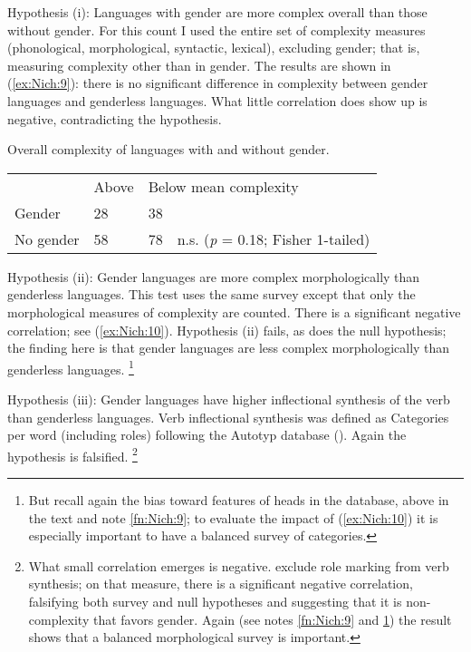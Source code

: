 \documentclass[output=collectionpaper]{langsci/langscibook}
\begin{document}
Hypothesis (i): Languages with gender are more complex overall than those without gender. For this count I used the entire set of complexity measures (phonological, morphological, syntactic, lexical), excluding gender; that is, measuring complexity other than in gender. The results are shown in (\ref{ex:Nich:9}): there is no significant difference in complexity between gender languages and genderless languages. What little correlation does show up is negative, contradicting the hypothesis.

\ea
\label{ex:Nich:9}
Overall complexity of languages with and without gender.   \\
\medskip
\begin{tabular}{p{2.7cm}p{1.3cm}p{1.3cm}l}
		 &	Above  &		\multicolumn{2}{l}{Below mean complexity} \\
	Gender &		28		 &38 \\
	No gender	 & 58	 &	78	& n.s. (\textit{p} = 0.18; Fisher 1-tailed) \\
\end{tabular}
\z

Hypothesis (ii): Gender languages are more complex morphologically than genderless languages.  This test uses the same survey except that only the morphological measures of complexity are counted. There is a significant negative correlation; see (\ref{ex:Nich:10}). Hypothesis (ii) fails, as does the null hypothesis; the finding here is that gender languages are less complex morphologically than genderless languages.%
\footnote{%
\label{fn:Nich:10}
But recall again the bias toward features of heads in the database, above in the text and note \ref{fn:Nich:9}; to evaluate the impact of (\ref{ex:Nich:10}) it is especially important to have a balanced survey of categories.
}%

%

Hypothesis (iii): Gender languages have higher inflectional synthesis of the verb than genderless languages. Verb inflectional synthesis was defined as Categories per word (including roles) following the Autotyp database (\citealt{Bickel2017}). Again the hypothesis is falsified.%
\footnote{%
What small correlation emerges is negative. \citet{Bickel2013} exclude role marking from verb synthesis; on that measure, there is a significant negative correlation, falsifying both survey and null hypotheses and suggesting that it is non-complexity that favors gender. Again (see notes \ref{fn:Nich:9} and \ref{fn:Nich:10}) the result shows that a balanced morphological survey is important.
}%
\end{document}
